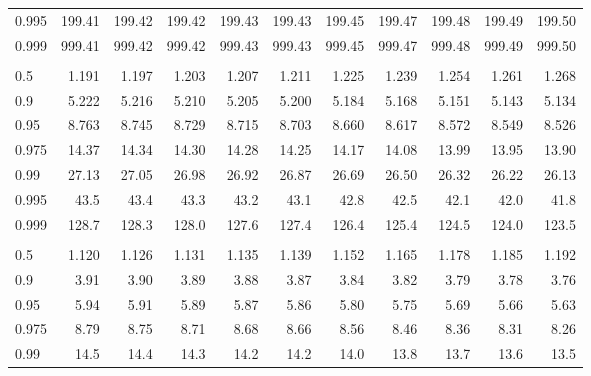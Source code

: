 \documentclass[]{article}
\begin{document}
\begin{table}[H]
\begin{tabular}{lrrrrrrrrrr}
\hspace{1em}0.995 & 199.41 & 199.42 & 199.42 & 199.43 & 199.43 & 199.45 & 199.47 & 199.48 & 199.49 & 199.50\\
\hspace{1em}0.999 & 999.41 & 999.42 & 999.42 & 999.43 & 999.43 & 999.45 & 999.47 & 999.48 & 999.49 & 999.50\\
\addlinespace[0.3em]
\multicolumn{11}{l}{\textbf{$k_2=3$}}\\
\hspace{1em}0.5 & 1.191 & 1.197 & 1.203 & 1.207 & 1.211 & 1.225 & 1.239 & 1.254 & 1.261 & 1.268\\
\hspace{1em}0.9 & 5.222 & 5.216 & 5.210 & 5.205 & 5.200 & 5.184 & 5.168 & 5.151 & 5.143 & 5.134\\
\hspace{1em}0.95 & 8.763 & 8.745 & 8.729 & 8.715 & 8.703 & 8.660 & 8.617 & 8.572 & 8.549 & 8.526\\
\hspace{1em}0.975 & 14.37 & 14.34 & 14.30 & 14.28 & 14.25 & 14.17 & 14.08 & 13.99 & 13.95 & 13.90\\
\hspace{1em}0.99 & 27.13 & 27.05 & 26.98 & 26.92 & 26.87 & 26.69 & 26.50 & 26.32 & 26.22 & 26.13\\
\hspace{1em}0.995 & 43.5 & 43.4 & 43.3 & 43.2 & 43.1 & 42.8 & 42.5 & 42.1 & 42.0 & 41.8\\
\hspace{1em}0.999 & 128.7 & 128.3 & 128.0 & 127.6 & 127.4 & 126.4 & 125.4 & 124.5 & 124.0 & 123.5\\
\addlinespace[0.3em]
\multicolumn{11}{l}{\textbf{$k_2=4$}}\\
\hspace{1em}0.5 & 1.120 & 1.126 & 1.131 & 1.135 & 1.139 & 1.152 & 1.165 & 1.178 & 1.185 & 1.192\\
\hspace{1em}0.9 & 3.91 & 3.90 & 3.89 & 3.88 & 3.87 & 3.84 & 3.82 & 3.79 & 3.78 & 3.76\\
\hspace{1em}0.95 & 5.94 & 5.91 & 5.89 & 5.87 & 5.86 & 5.80 & 5.75 & 5.69 & 5.66 & 5.63\\
\hspace{1em}0.975 & 8.79 & 8.75 & 8.71 & 8.68 & 8.66 & 8.56 & 8.46 & 8.36 & 8.31 & 8.26\\
\hspace{1em}0.99 & 14.5 & 14.4 & 14.3 & 14.2 & 14.2 & 14.0 & 13.8 & 13.7 & 13.6 & 13.5\\

\end{tabular}
\end{table}
\end{document}
